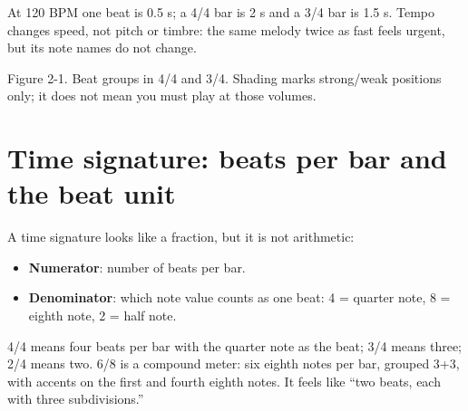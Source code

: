 At 120 BPM one beat is 0.5 s; a 4/4 bar is 2 s and a 3/4 bar is 1.5 s. Tempo changes speed, not pitch or timbre: the same melody twice as fast feels urgent, but its note names do not change.

\begin{center}

\small Figure 2-1. Beat groups in 4/4 and 3/4. Shading marks strong/weak positions only; it does not mean you must play at those volumes.
\end{center}

\section{Time signature: beats per bar and the beat unit}

A time signature looks like a fraction, but it is not arithmetic:

\begin{itemize}
  \item \textbf{Numerator}: number of beats per bar.
  \item \textbf{Denominator}: which note value counts as one beat: 4 = quarter note, 8 = eighth note, 2 = half note.
\end{itemize}

4/4 means four beats per bar with the quarter note as the beat; 3/4 means three; 2/4 means two. 6/8 is a compound meter: six eighth notes per bar, grouped 3+3, with accents on the first and fourth eighth notes. It feels like ``two beats, each with three subdivisions.''

